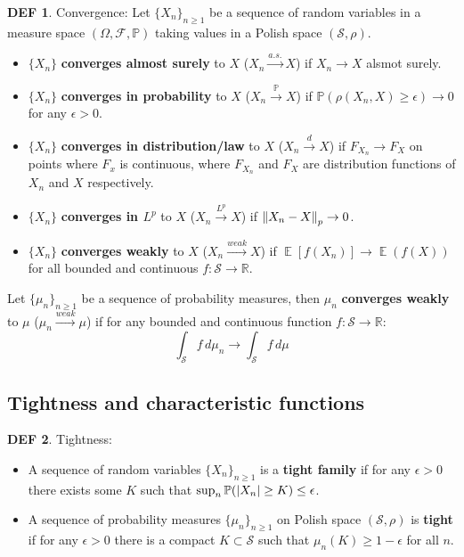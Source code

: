 \documentclass[hidelinks,11pt]{article}
\theoremstyle{definition}
\newtheorem*{defin}{DEF}
\theoremstyle{dotless}
\theoremstyle{remark}
\DeclareMathOperator{\E}{\mathbb{E}}
\DeclareMathOperator{\1}{\mathbf{1}}
\begin{document}
\begin{defin}Convergence: Let $\{X_n\}_{n\geq1}$ be a sequence of random variables in a measure space $(\Omega,\mathcal{F},\mathbb{P})$ taking values in a Polish space $(\mathcal{S},\rho)$.\begin{itemize}
    \item $\{X_n\}$ \textbf{converges almost surely} to $X$ ($X_n\xrightarrow{a.s.}X$) if $X_n\to X$ alsmot surely.
    \item $\{X_n\}$ \textbf{converges in probability} to $X$ ($X_n\xrightarrow{\mathbb{P}}X$) if $\mathbb{P}(\rho(X_n,X)\geq\epsilon)\to0$ for any $\epsilon>0$.
    \item $\{X_n\}$ \textbf{converges in distribution/law} to $X$ ($X_n\xrightarrow{d}X$) if $F_{X_n}\to F_X$ on points where $F_x$ is continuous, where $F_{X_n}$ and $F_X$ are distribution functions of $X_n$ and $X$ respectively.
    \item $\{X_n\}$ \textbf{converges in $L^p$} to $X$ ($X_n\xrightarrow{L^p}X$) if $\norm{X_n-X}_p\to0$.
    \item $\{X_n\}$ \textbf{converges weakly} to $X$ ($X_n\xrightarrow{weak}X$) if $\E[f(X_n)]\to\E(f(X))$ for all bounded and continuous $f:\mathcal{S}\to\mathbb{R}$.
\end{itemize}
Let $\{\mu_n\}_{n\geq1}$ be a sequence of probability measures, then $\mu_n$ \textbf{converges weakly} to $\mu$ ($\mu_n\xrightarrow{weak}\mu$) if for any bounded and continuous function $f:\mathcal{S}\to\mathbb{R}$:
\[\int_\mathcal{S}f\,d\mu_n\to\int_\mathcal{S}f\,d\mu\]
\end{defin}

\subsection{Tightness and characteristic functions}

\begin{defin}Tightness:\begin{itemize}
    \item A sequence of random variables $\{X_n\}_{n\geq1}$ is a \textbf{tight family} if for any $\epsilon>0$ there exists some $K$ such that $\sup_n\mathbb{P}(\abs{X_n}\geq K)\leq\epsilon$.
    \item A sequence of probability measures $\{\mu_n\}_{n\geq1}$ on Polish space $(\mathcal{S},\rho)$ is \textbf{tight} if for any $\epsilon>0$ there is a compact $K\subset\mathcal{S}$ such that $\mu_n(K)\geq1-\epsilon$ for all $n$.
\end{itemize}

\end{defin}
\end{document}

